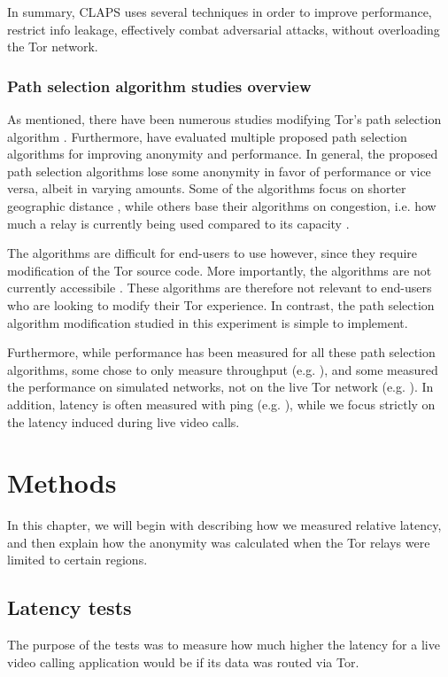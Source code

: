 \documentclass{kththesis}
\begin{document}
In summary, CLAPS uses several techniques in order to improve performance, restrict info leakage, effectively combat adversarial attacks, without overloading the Tor network.

\subsection{Path selection algorithm studies overview}
As mentioned, there have been numerous studies modifying Tor's path selection algorithm \parencite{CLAPS}\parencite{LASTor}\parencite{5684020}\parencite{1866345}\parencite{wang2012congestion}. Furthermore, \textcite{wacek2013empirical} have evaluated multiple proposed path selection algorithms for improving anonymity and performance. In general, the proposed path selection algorithms lose some anonymity in favor of performance or vice versa, albeit in varying amounts. Some of the algorithms focus on shorter geographic distance \parencite{LASTor}, while others base their algorithms on congestion, i.e. how much a relay is currently being used compared to its capacity \parencite{wang2012congestion}.

The algorithms are difficult for end-users to use however, since they require modification of the Tor source code. More importantly, the algorithms are not currently accessibile \parencite{CLAPSgithub}. These algorithms are therefore not relevant to end-users who are looking to modify their Tor experience. In contrast, the path selection algorithm modification studied in this experiment is simple to implement.

Furthermore, while performance has been measured for all these path selection algorithms, some chose to only measure throughput (e.g. \textcite{5684020}), and some measured the performance on simulated networks, not on the live Tor network (e.g. \textcite{CLAPS}). In addition, latency is often measured with ping (e.g. \textcite{wacek2013empirical}), while we focus strictly on the latency induced during live video calls.

\chapter{Methods}
In this chapter, we will begin with describing how we measured relative latency, and then explain how the anonymity was calculated when the Tor relays were limited to certain regions.

\section{Latency tests}
The purpose of the tests was to measure how much higher the latency for a live video calling application would be if its data was routed via Tor.
\end{document}
